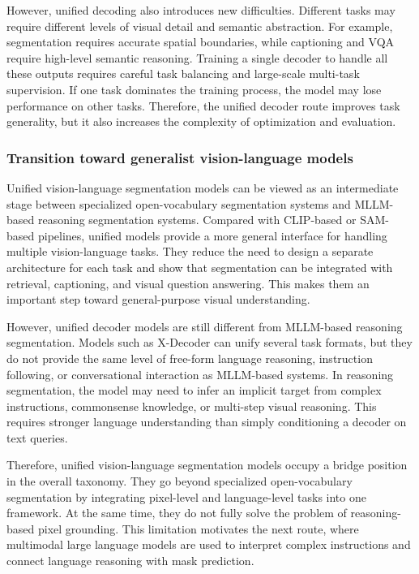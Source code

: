 However, unified decoding also introduces new difficulties. 
Different tasks may require different levels of visual detail and semantic abstraction. 
For example, segmentation requires accurate spatial boundaries, while captioning and VQA require high-level semantic reasoning. 
Training a single decoder to handle all these outputs requires careful task balancing and large-scale multi-task supervision. 
If one task dominates the training process, the model may lose performance on other tasks. 
Therefore, the unified decoder route improves task generality, but it also increases the complexity of optimization and evaluation.

\subsubsection{Transition toward generalist vision-language models}

Unified vision-language segmentation models can be viewed as an intermediate stage between specialized open-vocabulary segmentation systems and MLLM-based reasoning segmentation systems. 
Compared with CLIP-based or SAM-based pipelines, unified models provide a more general interface for handling multiple vision-language tasks. 
They reduce the need to design a separate architecture for each task and show that segmentation can be integrated with retrieval, captioning, and visual question answering. 
This makes them an important step toward general-purpose visual understanding.

However, unified decoder models are still different from MLLM-based reasoning segmentation. 
Models such as X-Decoder can unify several task formats, but they do not provide the same level of free-form language reasoning, instruction following, or conversational interaction as MLLM-based systems. 
In reasoning segmentation, the model may need to infer an implicit target from complex instructions, commonsense knowledge, or multi-step visual reasoning. 
This requires stronger language understanding than simply conditioning a decoder on text queries.

Therefore, unified vision-language segmentation models occupy a bridge position in the overall taxonomy. 
They go beyond specialized open-vocabulary segmentation by integrating pixel-level and language-level tasks into one framework. 
At the same time, they do not fully solve the problem of reasoning-based pixel grounding. 
This limitation motivates the next route, where multimodal large language models are used to interpret complex instructions and connect language reasoning with mask prediction.

